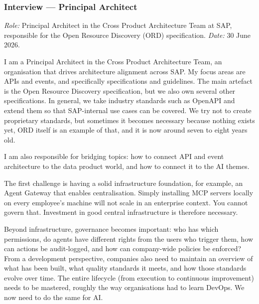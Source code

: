 \subsubsection{Interview --- Principal Architect}

\noindent\textit{Role:} Principal Architect in the Cross Product Architecture Team at SAP, responsible for the Open Resource Discovery (ORD) specification. \textit{Date:} 30 June 2026.

\medskip{}

I am a Principal Architect in the Cross Product Architecture Team, an organisation that drives architecture alignment across SAP. My focus areas are APIs and events, and specifically specifications and guidelines. The main artefact is the Open Resource Discovery specification, but we also own several other specifications. In general, we take industry standards such as OpenAPI and extend them so that SAP-internal use cases can be covered. We try not to create proprietary standards, but sometimes it becomes necessary because nothing exists yet, ORD itself is an example of that, and it is now around seven to eight years old.

I am also responsible for bridging topics: how to connect API and event architecture to the data product world, and how to connect it to the AI themes.

\medskip{}

The first challenge is having a solid infrastructure foundation, for example, an Agent Gateway that enables centralisation. Simply installing MCP servers locally on every employee's machine will not scale in an enterprise context. You cannot govern that. Investment in good central infrastructure is therefore necessary.

Beyond infrastructure, governance becomes important: who has which permissions, do agents have different rights from the users who trigger them, how can actions be audit-logged, and how can company-wide policies be enforced? From a development perspective, companies also need to maintain an overview of what has been built, what quality standards it meets, and how those standards evolve over time. The entire lifecycle (from execution to continuous improvement) needs to be mastered, roughly the way organisations had to learn DevOps. We now need to do the same for AI.

